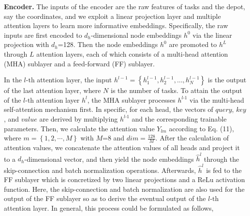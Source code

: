 \documentclass[lettersize,journal]{IEEEtran}
\begin{document}
	\textbf{Encoder.} The inputs of the encoder are the raw features of tasks and the depot, say the coordinates, and we exploit a linear projection layer and multiple attention layers to learn more informative embeddings. Specifically, the raw inputs are first encoded to ${{d}_{h}}$-dimensional node embeddings ${{h}^{0}}$ via the linear projection with ${{d}_{h}}$=128. Then the node embeddings ${{h}^{0}}$ are promoted to ${{h}^{L}}$ through $L$ attention layers, each of which consists of a multi-head attention (MHA) sublayer and a feed-forward (FF) sublayer.
	
	In the $l\text{-th}$ attention layer, the input ${{h}^{l-1}}=\left\{ h_{1}^{l-1},h_{2}^{l-1},\ldots ,h_{N}^{l-1} \right\}$ is the output of the last attention layer, where $N$ is the number of tasks. To attain the output of the $l\text{-th}$ attention layer ${{h}^{l}}$, the MHA sublayer processes ${{h}^{l\text{-1}}}$ via the multi-head self-attention mechanism first. In specific, for each head, the vectors of $query$, $key$, and $value$ are derived by multiplying ${{h}^{l\text{-1}}}$ and the corresponding trainable parameters. Then, we calculate the attention value ${{Y}_{lm}}$ according to Eq. (11), where $m=\left\{ 1,2,\cdots ,M \right\}$ with $M$=8 and $dim=\frac{128}{M}$. After the calculation of attention values, we concatenate the attention values of all heads and project it to a ${{d}_{h}}$-dimensional vector, and then yield the node embeddings ${{\hat{h}}^{l}}$ through the skip-connection and batch normalization operations. Afterwards, ${{\hat{h}}^{l}}$ is fed to the FF sublayer which is concretized by two linear projections and a ReLu activation function. Here, the skip-connection and batch normalization are also used for the output of the FF sublayer so as to derive the eventual output of the $l\text{-th}$ attention layer. In general, this process could be formulated as follows,
	
\end{document}
